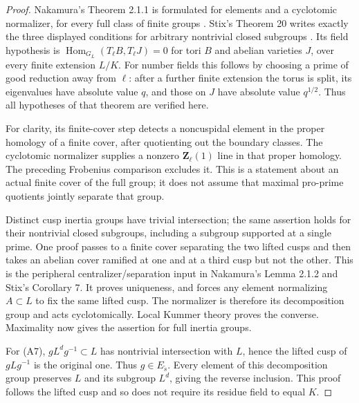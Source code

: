 \begin{proof}
Nakamura's Theorem 2.1.1 is formulated for elements and a
cyclotomic normalizer, for every full class of finite groups
\cite{A_Nakamura1994}.  Stix's Theorem 20 writes exactly the
three displayed conditions for arbitrary nontrivial closed
subgroups \cite{A_StixCuspidal}.  Its field hypothesis is
$\operatorname{Hom}_{G_L}(T_\ell B,T_\ell J)=0$ for tori
$B$ and abelian varieties $J$, over every finite extension
$L/K$.  For number fields this follows by choosing a prime
of good reduction away from $\ell$: after a further finite
extension the torus is split, its eigenvalues have absolute
value $q$, and those on $J$ have absolute value $q^{1/2}$.
Thus all hypotheses of that theorem are verified here.

For clarity, its finite-cover step detects a noncuspidal
element in the proper homology of a finite cover, after
quotienting out the boundary classes.  The cyclotomic
normalizer supplies a nonzero $\mathbf Z_\ell(1)$ line in
that proper homology.  The preceding Frobenius comparison
excludes it.  This is a statement about an actual finite
cover of the full group; it does not assume that maximal
pro-prime quotients jointly separate that group.

Distinct cusp inertia groups have trivial intersection;
the same assertion holds for their nontrivial closed
subgroups, including a subgroup supported at a single
prime.  One proof passes to a finite cover separating the
two lifted cusps and then takes an abelian cover ramified
at one and at a third cusp but not the other.  This is the
peripheral centralizer/separation input in Nakamura's
Lemma 2.1.2 and Stix's Corollary 7.  It proves uniqueness,
and forces any element normalizing $A\subset L$ to fix
the same lifted cusp.  The normalizer is therefore its
decomposition group and acts cyclotomically.  Local
Kummer theory proves the converse.  Maximality now gives
the assertion for full inertia groups.

For (A7), $gL^dg^{-1}\subset L$ has nontrivial intersection
with $L$, hence the lifted cusp of $gLg^{-1}$ is the
original one.  Thus $g\in E_{\widetilde s}$.  Every element
of this decomposition group preserves $L$ and its subgroup
$L^d$, giving the reverse inclusion.  This proof follows
the lifted cusp and so does not require its residue field
to equal $K$.
\end{proof}

